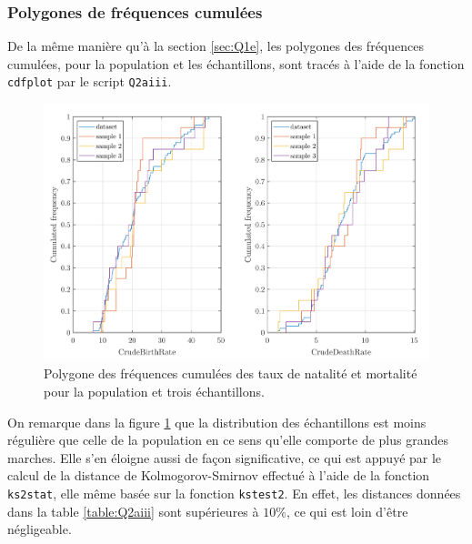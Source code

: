 \documentclass[a4paper, 12pt]{article}
\begin{document}
	\subsubsection{Polygones de fréquences cumulées} \label{sec:Q2aiii}
	De la même manière qu'à la section \ref{sec:Q1e}, les polygones des fréquences cumulées, pour la population et les échantillons, sont tracés à l'aide de la fonction \texttt{cdfplot} par le script \texttt{Q2aiii}. \par
	\begin{figure}[h!]
		\centering
		\includegraphics[scale=0.24]{resources/pdf/q2aiii.pdf}
		\caption{Polygone des fréquences cumulées des taux de natalité et mortalité pour la population et trois échantillons.}
		\label{figure:Q2aiii}
	\end{figure}
	On remarque dans la figure \ref{figure:Q2aiii} que la distribution des échantillons est moins régulière que celle de la population en ce sens qu'elle comporte de plus grandes \og{}marches\fg{}. Elle s'en éloigne aussi de façon significative, ce qui est appuyé par le calcul de la distance de Kolmogorov-Smirnov effectué à l'aide de la fonction \texttt{ks2stat}, elle même basée sur la fonction \texttt{kstest2}. En effet, les distances données dans la table \ref{table:Q2aiii} sont supérieures à $10 \%$, ce qui est loin d'être négligeable. \par
\end{document}
